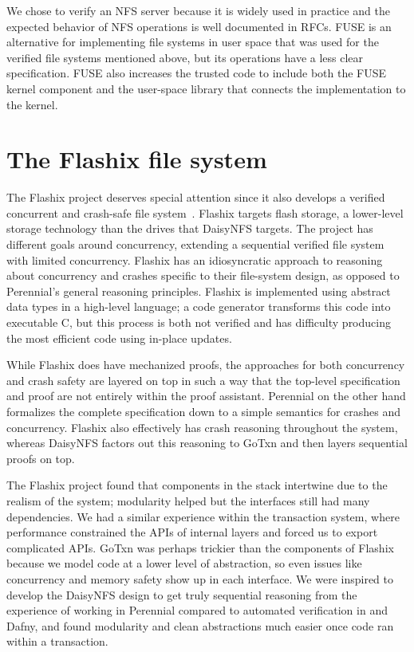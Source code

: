 We chose to verify an NFS server because it is widely used in practice and the
expected behavior of NFS operations is well documented in RFCs. FUSE is an
alternative for implementing file systems in user space that was used for the
verified file systems mentioned above, but its operations have a less clear
specification. FUSE also increases the trusted code to include both the FUSE
kernel component and the user-space library that connects the implementation to
the kernel.

\section{The Flashix file system}
\label{sec:rel:flashix}

The Flashix project deserves special attention since it also develops a verified
concurrent and crash-safe file system~\cite{bodenmuller:concurrent-flashix}.
Flashix targets flash storage, a lower-level storage technology than the drives
that DaisyNFS targets. The project has different goals around concurrency,
extending a sequential verified file system with limited concurrency. Flashix
has an idiosyncratic approach to reasoning about concurrency and crashes
specific to their file-system design, as opposed to Perennial's general
reasoning principles. Flashix is implemented using abstract data types in a
high-level language; a code generator transforms this code into executable C,
but this process is both not verified and has difficulty producing the most
efficient code using in-place updates.

While Flashix does have mechanized proofs, the approaches for both concurrency
and crash safety are layered on top in such a way that the top-level
specification and proof are not entirely within the proof assistant. Perennial
on the other hand formalizes the complete specification down to a simple
semantics for crashes and concurrency. Flashix also effectively has crash
reasoning throughout the system, whereas DaisyNFS factors out this reasoning to
GoTxn and then layers sequential proofs on top.

The Flashix project found that components in the stack intertwine due to the
realism of the system; modularity helped but the interfaces still had many
dependencies. We had a similar experience within the transaction system, where
performance constrained the APIs of internal layers and forced us to export
complicated APIs. GoTxn was perhaps trickier than the components of Flashix
because we model code at a lower level of abstraction, so even issues like
concurrency and memory safety show up in each interface. We were inspired to
develop the DaisyNFS design to get truly sequential reasoning from the
experience of working in Perennial compared to automated verification in \fstar
and Dafny, and found modularity and clean abstractions much easier once
code ran within a transaction.

